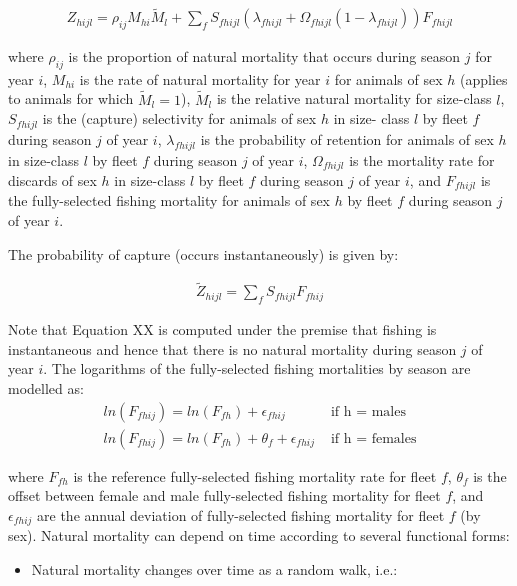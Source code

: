 \documentclass[]{article}
\providecommand{\tightlist}{%
  \setlength{\itemsep}{0pt}\setlength{\parskip}{0pt}}
\begin{document}
\begin{align}
 Z_{hijl} = \rho_{ij}M_{hi}\tilde{M}_{l} + \sum_{f} S_{fhijl}(\lambda_{fhijl} + \Omega_{fhijl}(1-\lambda_{fhijl}))F_{fhijl}
\end{align}

where \(\rho_{ij}\) is the proportion of natural mortality that occurs
during season \(j\) for year \(i\), \(M_{hi}\) is the rate of natural
mortality for year \(i\) for animals of sex \(h\) (applies to animals
for which \(\tilde{M}_{l} = 1\)), \(\tilde{M}_{l}\) is the relative
natural mortality for size-class \(l\), \(S_{fhijl}\) is the (capture)
selectivity for animals of sex \(h\) in size- class \(l\) by fleet \(f\)
during season \(j\) of year \(i\), \(\lambda_{fhijl}\) is the
probability of retention for animals of sex \(h\) in size-class \(l\) by
fleet \(f\) during season \(j\) of year \(i\), \(\Omega_{fhijl}\) is the
mortality rate for discards of sex \(h\) in size-class \(l\) by fleet
\(f\) during season \(j\) of year \(i\), and \(F_{fhijl}\) is the
fully-selected fishing mortality for animals of sex \(h\) by fleet \(f\)
during season \(j\) of year \(i\).

The probability of capture (occurs instantaneously) is given by:

\begin{align}
 \widetilde{Z}_{hijl} = \sum_{f} S_{fhijl}F_{fhij}
\end{align}

Note that Equation XX is computed under the premise that fishing is
instantaneous and hence that there is no natural mortality during season
\(j\) of year \(i\). The logarithms of the fully-selected fishing
mortalities by season are modelled as: \begin{align}
 ln(F_{fhij}) = ln(F_{fh}) + \epsilon_{fhij}  & \text{  if h = males} \\[2ex]
 ln(F_{fhij}) = ln(F_{fh}) + \theta_{f} + \epsilon_{fhij}  & \text{  if h = females} 
\end{align}

where \(F_{fh}\) is the reference fully-selected fishing mortality rate
for fleet \(f\), \(\theta_{f}\) is the offset between female and male
fully-selected fishing mortality for fleet \(f\), and
\(\epsilon_{fhij}\) are the annual deviation of fully-selected fishing
mortality for fleet \(f\) (by sex). Natural mortality can depend on time
according to several functional forms:

\begin{itemize}
\tightlist
\item
  Natural mortality changes over time as a random walk, i.e.:
\end{itemize}
\end{document}
